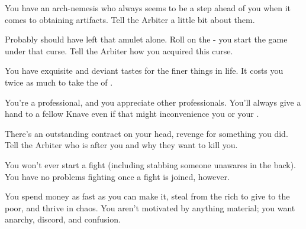 \begin{multicols*}{2}
 

    \begin{center}
    \end{center}




    
    You have an arch-nemesis who always seems to be a step ahead of you when it comes to obtaining artifacts. Tell the Arbiter a little bit about them.


    Probably should have left that amulet alone. Roll on the  - you start the game under that curse. Tell the Arbiter how you acquired this curse.


    You have exquisite and deviant tastes for the finer things in life. It costs you twice as much to take the  of .


    You're a professional, and you appreciate other professionals. You'll always give a hand to a fellow Knave even if that might inconvenience you or your .


    There's an outstanding contract on your head, revenge for something you did. Tell the Arbiter who is after you and why they want to kill you.


    You won't ever start a fight (including stabbing someone unawares in the back). You have no problems fighting once a fight is joined, however. 



    You spend money as fast as you can make it, steal from the rich to give to the poor, and thrive in chaos. You aren't motivated by anything material; you want anarchy, discord, and confusion.  



\end{multicols*}
